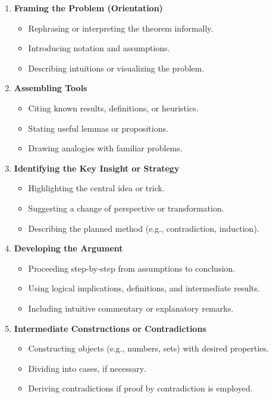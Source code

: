 \documentclass[12pt]{article}
\begin{document}
\begin{enumerate}[label=\textbf{\arabic*.}]
    \item \textbf{Framing the Problem (Orientation)}
    \begin{itemize}
        \item Rephrasing or interpreting the theorem informally.
        \item Introducing notation and assumptions.
        \item Describing intuitions or visualizing the problem.
    \end{itemize}

    \item \textbf{Assembling Tools}
    \begin{itemize}
        \item Citing known results, definitions, or heuristics.
        \item Stating useful lemmas or propositions.
        \item Drawing analogies with familiar problems.
    \end{itemize}

    \item \textbf{Identifying the Key Insight or Strategy}
    \begin{itemize}
        \item Highlighting the central idea or trick.
        \item Suggesting a change of perspective or transformation.
        \item Describing the planned method (e.g., contradiction, induction).
    \end{itemize}

    \item \textbf{Developing the Argument}
    \begin{itemize}
        \item Proceeding step-by-step from assumptions to conclusion.
        \item Using logical implications, definitions, and intermediate results.
        \item Including intuitive commentary or explanatory remarks.
    \end{itemize}

    \item \textbf{Intermediate Constructions or Contradictions}
    \begin{itemize}
        \item Constructing objects (e.g., numbers, sets) with desired properties.
        \item Dividing into cases, if necessary.
        \item Deriving contradictions if proof by contradiction is employed.
    \end{itemize}


\end{enumerate}
\end{document}
